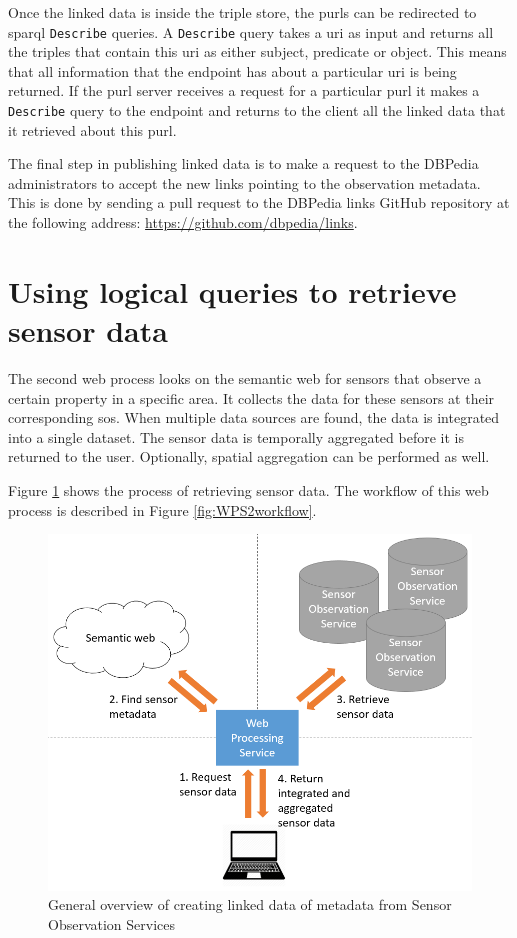 Once the linked data is inside the triple store, the \acp{purl} can be redirected to \ac{sparql} \texttt{Describe} queries. A \texttt{Describe} query takes a \ac{uri} as input and returns all the triples that contain this \ac{uri} as either subject, predicate or object. This means that all information that the endpoint has about a particular \ac{uri} is being returned. If the \ac{purl} server receives a request for a particular \ac{purl} it makes a \texttt{Describe} query to the endpoint and returns to the client all the linked data that it retrieved about this \ac{purl}.  

The final step in publishing linked data is to make a request to the DBPedia administrators to accept the new links pointing to the observation metadata. This is done by sending a pull request to the DBPedia links GitHub repository at the following address: \url{https://github.com/dbpedia/links}.


\section{Using logical queries to retrieve sensor data}
\label{par:logicalDesign}
The second web process looks on the semantic web for sensors that observe a certain property in a specific area. It collects the data for these sensors at their corresponding \acl{sos}. When multiple data sources are found, the data is integrated into a single dataset. The sensor data is temporally aggregated before it is returned to the user. Optionally, spatial aggregation can be performed as well.

Figure \ref{fig:WPS2} shows the process of retrieving sensor data. The workflow of this web process is described in Figure \ref{fig:WPS2workflow}.

\begin{figure}
	\centering
	\includegraphics[width=0.8\linewidth]{UML/wps2diagram.PNG}
	\caption{General overview of creating linked data of metadata from Sensor Observation Services}
	\label{fig:WPS2}
\end{figure}

